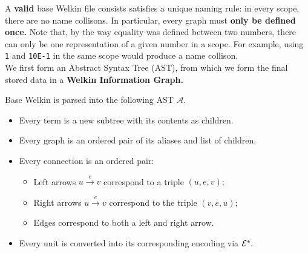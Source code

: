 A \textbf{valid} base Welkin file consists satisfies a unique naming rule: in every scope, there are no name collisons. In particular, every graph must \textbf{only be defined once.} Note that, by the way equality was defined between two numbers,
  there can only be one representation of a given number in a scope. For example, using \texttt{1} and \texttt{10E-1} in the same scope would produce a name collison.
\\ We first form an Abstract Syntax Tree (AST), from which we form the final stored data in a \textbf{Welkin Information Graph.}
\begin{definition}
  Base Welkin is parsed into the following AST $\mathcal{A}.$
  \begin{itemize}
	\item Every term is a new subtree with its contents as children.
    \item Every graph is an ordered pair of its aliases and list of children.
    \item Every connection is an ordered pair:
		  \begin{itemize}
			\item Left arrows $u \xrightarrow{e} v$ correspond to a triple $(u, e, v);$
			\item Right arrows $u \xrightarrow{e} v$ correspond to the triple $(v, e, u);$
			\item Edges correspond to both a left and right arrow.
		  \end{itemize}
	\item Every unit is converted into its corresponding encoding via $\mathcal{E}^{*}.$
  \end{itemize}
 \end{definition}
